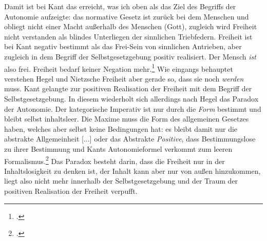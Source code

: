 \documentclass[12pt, a4paper, openany]{report}
\begin{document}
Damit ist bei Kant das erreicht, was ich oben als das Ziel des Begriffs der Autonomie aufzeigte: 
das normative Gesetz ist zurück bei dem Menschen und obliegt nicht einer Macht außerhalb des Menschen (Gott), zugleich wird Freiheit nicht verstanden als blindes Unterliegen der sinnlichen Triebfedern. 
Freiheit ist bei Kant negativ bestimmt als das Frei-Sein von sinnlichen Antrieben, aber zugleich in dem Begriff der Selbstgesetzgebung positiv realisiert. 
Der Mensch \textit{ist} also frei. 
Freiheit bedarf keiner Negation mehr.\footcite[Vgl.][53]{menke_autonomie_2018}
Wie eingangs behauptet verstehen Hegel und Nietzsche Freiheit aber gerade so, dass sie noch \emph{werden} muss. 
Kant gelangte zur positiven Realisation der Freiheit mit dem Begriff der Selbstgesetzgebung. 
In diesem wiederholt sich allerdings nach Hegel das Paradox der Autonomie. Der kategorische Imperativ ist nur durch die \textit{Form} bestimmt und bleibt selbst inhaltsleer.
Die Maxime muss die Form des allgemeinen Gesetzes haben, welches aber selbst keine Bedingungen hat:
es \glqq bleibt damit nur die abstrakte Allgemeinheit [...] oder das Abstrakte \textit{Positive}, dass Bestimmungslose zu ihrer Bestimmung\grqq{} und Kants Autonomieformel verkommt zum \glqq leeren Formalismus\grqq.\footcite[][§135, S. 139.]{hegel_grundlinien_2017}
Das Paradox besteht darin, dass die Freiheit nur in der Inhaltslosigkeit zu denken ist, der Inhalt kann aber nur von außen hinzukommen, liegt also nicht mehr innerhalb der Selbstgesetzgebung und der Traum der positiven Realisation der Freiheit verpufft.
\end{document}
